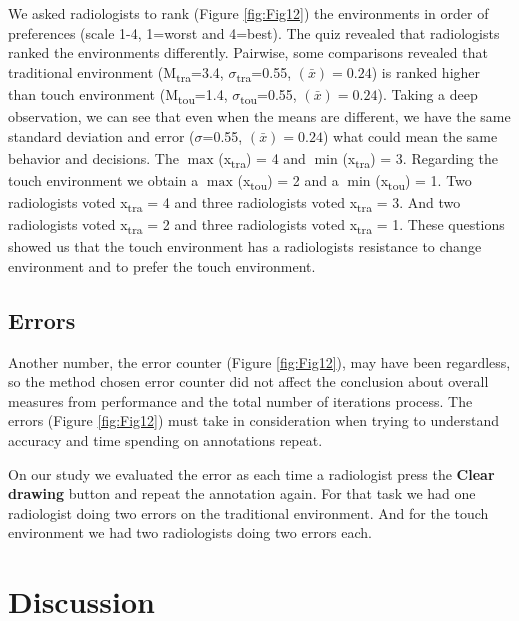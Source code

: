 \documentclass{sigchi}
\begin{document}
We asked radiologists to rank (Figure \ref{fig:Fig12}) the environments in order of preferences (scale 1-4, 1=worst and 4=best). The quiz revealed that radiologists ranked the environments differently. Pairwise, some comparisons revealed that traditional environment (M\textsubscript{tra}=3.4, $\sigma$\textsubscript{tra}=0.55, {}$\left({\bar x}\right)=0.24$) is ranked higher than touch environment (M\textsubscript{tou}=1.4, $\sigma$\textsubscript{tou}=0.55, {}$\left({\bar x}\right)=0.24$). Taking a deep observation, we can see that even when the means are different, we have the same standard deviation and error ($\sigma$\textsubscript{}=0.55, {}$\left({\bar x}\right)=0.24$) what could mean the same behavior and decisions. The $\max_{}$(x\textsubscript{tra}) = 4 and $\min_{}$(x\textsubscript{tra}) = 3. Regarding the touch environment we obtain a $\max_{}$(x\textsubscript{tou}) = 2 and a $\min_{}$(x\textsubscript{tou}) = 1. Two radiologists voted x\textsubscript{tra} = 4 and three radiologists voted x\textsubscript{tra} = 3. And two radiologists voted x\textsubscript{tra} = 2 and three radiologists voted x\textsubscript{tra} = 1. These questions showed us that the touch environment has a radiologists resistance to change environment and to prefer the touch environment.

\subsection{Errors}

Another number, the error counter (Figure \ref{fig:Fig12}), may have been regardless, so the method chosen error counter did not affect the conclusion about overall measures from performance and the total number of iterations process. The errors (Figure \ref{fig:Fig12}) must take in consideration when trying to understand accuracy and time spending on annotations repeat.

On our study we evaluated the error as each time a radiologist press the \textbf{Clear drawing} button and repeat the annotation again. For that task we had one radiologist doing two errors on the traditional environment. And for the touch environment we had two radiologists doing two errors each.

\section{Discussion}
\end{document}
